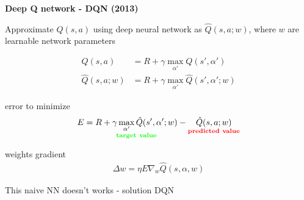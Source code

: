 \documentclass[xcolor=dvipsnames]{beamer}
\begin{document}
\begin{frame}{\bf Deep Q network - DQN (2013)}

Approximate $Q(s, a)$ using deep neural network as $\hat{Q}(s, a; w)$, where $w$ are learnable network parameters

\begin{align*}
  Q(s, a) &= R + \gamma \max \limits_{\alpha'} Q(s', \alpha') \\
  \hat{Q}(s, a; w) &= R + \gamma \max \limits_{\alpha'} \hat{Q}(s', \alpha'; w)
\end{align*}

error to minimize
\begin{align*}
  E = \underset{\bf \color{green} target\ value}{R + \gamma \max \limits_{\alpha'} \hat{Q}(s', \alpha'; w)} - \underset{\bf \color{red} predicted\ value}{\hat{Q}(s, a; w) }
\end{align*}

weights gradient
\begin{align*}
  \Delta w = \eta E \nabla _w \hat{Q}(s, \alpha, w)
\end{align*}

This naive NN doesn't works - solution DQN

\end{frame}
\end{document}
